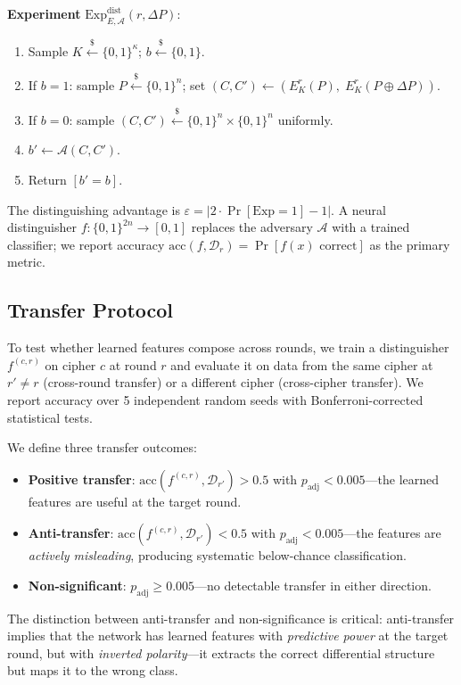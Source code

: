 \documentclass[runningheads]{llncs}
\begin{document}
\medskip\noindent
\textbf{Experiment} $\mathrm{Exp}^{\mathrm{dist}}_{E,\mathcal{A}}(r, \Delta P)$:
\begin{enumerate}[itemsep=1pt]
  \item Sample $K \xleftarrow{\$} \{0,1\}^\kappa$; $b \xleftarrow{\$} \{0,1\}$.
  \item If $b=1$: sample $P \xleftarrow{\$} \{0,1\}^n$; set $(C,C') \gets (E^r_K(P),\; E^r_K(P \oplus \Delta P))$.
  \item If $b=0$: sample $(C,C') \xleftarrow{\$} \{0,1\}^n \times \{0,1\}^n$ uniformly.
  \item $b' \gets \mathcal{A}(C, C')$.
  \item Return $[b' = b]$.
\end{enumerate}
The distinguishing advantage is $\varepsilon = |2 \cdot \Pr[\mathrm{Exp} = 1] - 1|$.
A neural distinguisher $f: \{0,1\}^{2n} \to [0,1]$ replaces the adversary $\mathcal{A}$ with a trained classifier; we report accuracy $\mathrm{acc}(f, \mathcal{D}_r) = \Pr[f(x) \text{ correct}]$ as the primary metric.

\subsection{Transfer Protocol}
\label{sec:transfer-protocol}

To test whether learned features compose across rounds, we train a distinguisher $f^{(c,r)}$ on cipher $c$ at round $r$ and evaluate it on data from the same cipher at $r' \neq r$ (cross-round transfer) or a different cipher (cross-cipher transfer).
We report accuracy over 5 independent random seeds with Bonferroni-corrected statistical tests.

We define three transfer outcomes:
\begin{itemize}[itemsep=1pt]
  \item \textbf{Positive transfer}: $\mathrm{acc}(f^{(c,r)}, \mathcal{D}_{r'}) > 0.5$ with $p_{\mathrm{adj}} < 0.005$---the learned features are useful at the target round.
  \item \textbf{Anti-transfer}: $\mathrm{acc}(f^{(c,r)}, \mathcal{D}_{r'}) < 0.5$ with $p_{\mathrm{adj}} < 0.005$---the features are \emph{actively misleading}, producing systematic below-chance classification.
  \item \textbf{Non-significant}: $p_{\mathrm{adj}} \geq 0.005$---no detectable transfer in either direction.
\end{itemize}
The distinction between anti-transfer and non-significance is critical: anti-transfer implies that the network has learned features with \emph{predictive power} at the target round, but with \emph{inverted polarity}---it extracts the correct differential structure but maps it to the wrong class.
\end{document}
